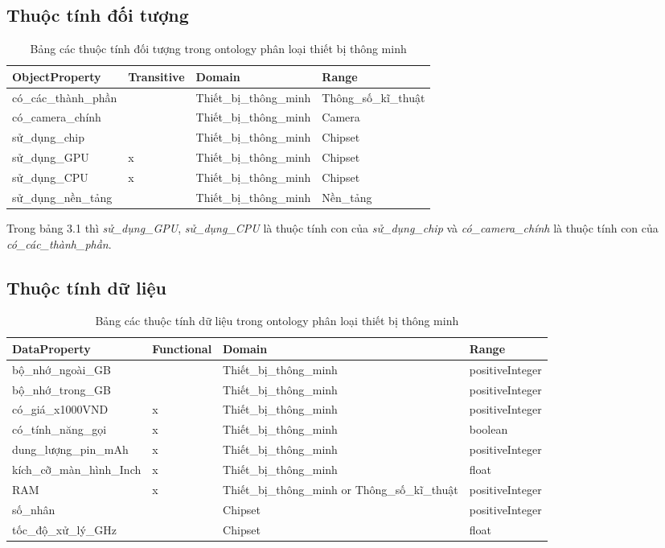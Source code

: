 {\subsection{Thuộc tính đối tượng}
\begin{table}[h!]
	\centering
\begin{tabular}{|p{4cm}|l|p{4cm}|p{4cm}|}
\hline
ObjectProperty & Transitive & Domain & Range \\\hline
có\_các\_thành\_phần & & Thiết\_bị\_thông\_minh & Thông\_số\_kĩ\_thuật \\\hline
có\_camera\_chính & & Thiết\_bị\_thông\_minh & Camera \\\hline
sử\_dụng\_chip &  & Thiết\_bị\_thông\_minh & Chipset \\\hline
sử\_dụng\_GPU & x & Thiết\_bị\_thông\_minh & Chipset \\\hline
sử\_dụng\_CPU & x & Thiết\_bị\_thông\_minh & Chipset \\\hline
sử\_dụng\_nền\_tảng & & Thiết\_bị\_thông\_minh & Nền\_tảng \\
\hline
\end{tabular}
\caption{Bảng các thuộc tính đối tượng trong ontology phân loại thiết bị thông minh \label{overflow}}  
\end{table}
Trong bảng 3.1 thì \textit{sử\_dụng\_GPU}, \textit{sử\_dụng\_CPU} là thuộc tính con của \textit{sử\_dụng\_chip} và \textit{có\_camera\_chính} là thuộc tính con của \textit{có\_các\_thành\_phần}.
\subsection{Thuộc tính dữ liệu}
\begin{table}[H]
\centering
\begin{tabular}{|l|l|p{4cm}|l|}
\hline
DataProperty & Functional & Domain & Range \\ \hline
bộ\_nhớ\_ngoài\_GB & & Thiết\_bị\_thông\_minh & positiveInteger \\\hline
bộ\_nhớ\_trong\_GB & & Thiết\_bị\_thông\_minh & positiveInteger \\\hline
có\_giá\_x1000VND & x & Thiết\_bị\_thông\_minh & positiveInteger \\\hline
có\_tính\_năng\_gọi & x & Thiết\_bị\_thông\_minh & boolean \\\hline
dung\_lượng\_pin\_mAh & x & Thiết\_bị\_thông\_minh & positiveInteger \\\hline
kích\_cỡ\_màn\_hình\_Inch & x & Thiết\_bị\_thông\_minh & float \\\hline
RAM & x & Thiết\_bị\_thông\_minh or Thông\_số\_kĩ\_thuật & positiveInteger \\\hline
số\_nhân & & Chipset & positiveInteger \\\hline
tốc\_độ\_xử\_lý\_GHz & & Chipset & float \\\hline
\end{tabular}
\caption{Bảng các thuộc tính dữ liệu trong ontology phân loại thiết bị thông minh \label{overflow}}  
\end{table}
}
